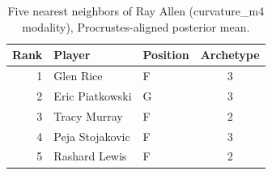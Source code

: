 \begin{table}[htbp]
  \centering\small
  \begin{tabular}{rllc}
    \toprule
    Rank & Player & Position & Archetype \\
    \midrule
    1 & Glen Rice & F & 3 \\
    2 & Eric Piatkowski & G & 3 \\
    3 & Tracy Murray & F & 2 \\
    4 & Peja Stojakovic & F & 3 \\
    5 & Rashard Lewis & F & 2 \\
    \bottomrule
  \end{tabular}
  \caption{Five nearest neighbors of Ray Allen (curvature_m4 modality), Procrustes-aligned posterior mean.}
  \label{tab:Ray_Allen_neighbors_curvature_m4}
\end{table}

